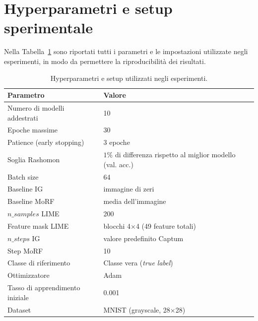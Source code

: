 \documentclass[12pt,a4paper,oneside]{report}
\numberwithin{figure}{chapter}
\numberwithin{table}{chapter}
\begin{document}
\section{Hyperparametri e setup sperimentale}

Nella Tabella~\ref{tab:hyperparams} sono riportati tutti i parametri e le
impostazioni utilizzate negli esperimenti, in modo da permettere la
riproducibilità dei risultati.

\begin{table}[H]
      \centering
      \renewcommand{\arraystretch}{1.2}
      \begin{tabular}{ll}
            \hline
            \textbf{Parametro}              & \textbf{Valore}                                             \\
            \hline
            Numero di modelli addestrati    & 10                                                          \\
            Epoche massime                  & 30                                                          \\
            Patience (early stopping)       & 3 epoche                                                    \\
            Soglia Rashomon                 & $1\%$ di differenza rispetto al miglior modello (val. acc.) \\
            Batch size                      & 64                                                          \\
            Baseline IG                     & immagine di zeri                                            \\
            Baseline MoRF                   & media dell’immagine                                         \\
            $n\_samples$ LIME               & 200                                                         \\
            Feature mask LIME               & blocchi 4×4 (49 feature totali)                             \\
            $n\_steps$ IG                   & valore predefinito Captum                                   \\
            Step MoRF                       & 10                                                          \\
            Classe di riferimento           & Classe vera (\textit{true label})                           \\
            Ottimizzatore                   & Adam                                                        \\
            Tasso di apprendimento iniziale & 0.001                                                       \\
            Dataset                         & MNIST (grayscale, 28×28)                                    \\
            \hline
      \end{tabular}
      \caption{Hyperparametri e setup utilizzati negli esperimenti.}
      \label{tab:hyperparams}
\end{table}
\end{document}
